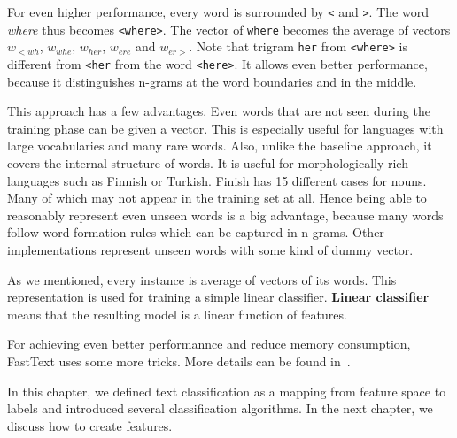 For even higher performance, every word is surrounded by \texttt{<} and \texttt{>}.
The word \textit{ where} thus becomes \texttt{<where>}.
The vector of \texttt{where} becomes the average of vectors
$w_{<wh}$, 
$w_{whe}$, 
$w_{her}$,
$w_{ere}$ and
$w_{er>}$.
Note that trigram {\tt her} from \texttt{<where>} is different from {\tt <her} from the word {\tt <here>}.
It allows even better performance, because it distinguishes n-grams at the word boundaries and in the middle.

This approach has a few advantages.
Even words that are not seen during the training phase can be given a vector.
This is especially useful for languages with large vocabularies and many rare words.
Also, unlike the baseline approach, it covers the internal structure of words.
It is useful for morphologically rich languages such as Finnish or Turkish.
Finish has 15 different cases for nouns.
Many of which may not appear in the training set at all.
Hence being able to reasonably represent even unseen words is a big advantage,
because many words follow word formation rules which can be captured in n-grams.
Other implementations represent unseen words with some kind of dummy vector.

As we mentioned, every instance is average of vectors of its words.
This representation is used for training a simple linear classifier.
\textbf{Linear classifier} means that the resulting model is a linear function
of features.

For achieving even better performannce and reduce memory consumption, FastText uses some more tricks.
More details can be found in~\citet{Joulin2017bag}.


In this chapter, we defined text classification as a mapping from feature space to labels
and introduced several classification algorithms.
In the next chapter, we discuss how to create features.
